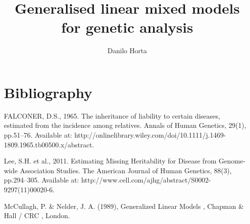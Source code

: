 \documentclass{TMarticle}
\author{Danilo Horta}
\title{Generalised linear mixed models for genetic analysis}
\begin{document}
\maketitle






\section{Bibliography}

FALCONER, D.S., 1965. The inheritance of liability to certain diseases,
estimated from the incidence among relatives. Annals of Human Genetics, 29(1),
pp.51–76. Available at:
http://onlinelibrary.wiley.com/doi/10.1111/j.1469-1809.1965.tb00500.x/abstract.

Lee, S.H. et al., 2011. Estimating Missing Heritability for Disease from
Genome-wide Association Studies. The American Journal of Human Genetics, 88(3),
pp.294–305. Available at:
http://www.cell.com/ajhg/abstract/S0002-9297(11)00020-6.

McCullagh, P. \& Nelder, J. A. (1989), Generalized Linear Models ,
Chapman \& Hall / CRC , London.


\end{document}
